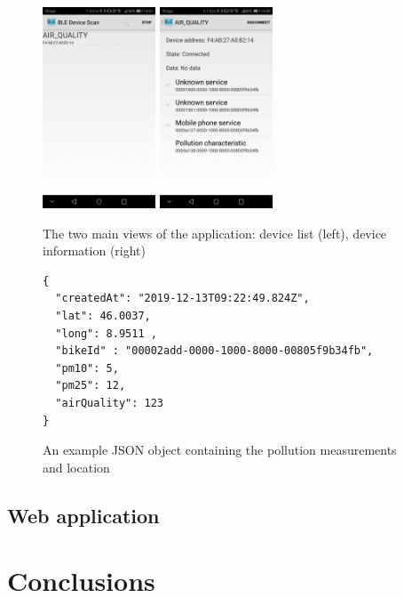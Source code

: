 \documentclass[12pt]{article}
\begin{document}
  \begin{figure}[H]
    \centering
    \includegraphics[width=0.3\textwidth]{images/android1.jpg}
    \includegraphics[width=0.3\textwidth]{images/android2.jpg}
    \caption{The two main views of the application: device list (left), device information (right)}
    \label{fig:app-scan-list}
  \end{figure}


  \begin{figure}[h]
    \centering
    \begin{verbatim}
{
  "createdAt": "2019-12-13T09:22:49.824Z",
  "lat": 46.0037,
  "long": 8.9511 ,
  "bikeId" : "00002add-0000-1000-8000-00805f9b34fb",
  "pm10": 5,
  "pm25": 12,
  "airQuality": 123
}
    \end{verbatim}
  \caption{An example JSON object containing the pollution measurements and location}\label{lst:json-packet}
  \end{figure}

  \subsection{Web application}
  \newpage
  \section{Conclusions}
  
\end{document}
